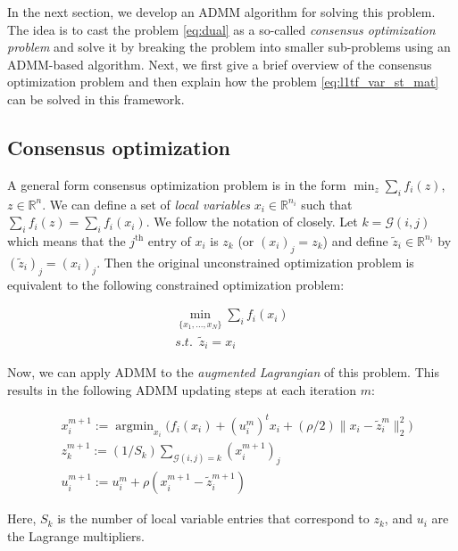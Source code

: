 \documentclass[review]{elsarticle}
\DeclareMathOperator*{\argmin}{argmin}
\begin{document}
In the next section, we develop an ADMM algorithm for solving this problem. The idea is to cast the problem \ref{eq:dual} as a so-called \textit{consensus optimization problem} \cite{boyd_distributed_2011} and solve it by breaking the problem into smaller sub-problems using an ADMM-based algorithm. Next, we first give a brief overview of the consensus optimization problem and then explain how the problem \ref{eq:l1tf_var_st_mat} can be solved in this framework.

\subsection{Consensus optimization}
\label{sec:consOpt}

A general form consensus optimization problem is in the form $\min_z \sum_i f_i(z)$, $z\in\mathbb{R}^n$. We can define a set of \textit{local variables} $x_i\in \mathbb{R}^{n_i}$ such that $\sum_i f_i(z)=\sum_i f_i(x_i)$. We follow the notation of \cite{boyd_distributed_2011} closely. Let $k=\mathscr{G}(i,j)$ which means that the $j^\text{th}$ entry of $x_i$ is $z_k$ (or $(x_i)_j=z_k$) and define $\tilde{z}_i \in \mathbb{R}^{n_i}$ by $(\tilde{z}_i)_j=(x_i)_j$. Then the original unconstrained optimization problem is equivalent to the following constrained optimization problem:

\begin{equation}
\begin{aligned}
\min_{\{x_1,...,x_N  \}} \sum_i f_i(x_i)\\
 s.t. \,\,\, \tilde{z}_i=x_i \,\,\,\,\,\,
\end{aligned}
\end{equation}

Now, we can apply ADMM to the \textit{augmented Lagrangian} of this problem. This results in the following ADMM updating steps at each iteration $m$:

\begin{equation}
\begin{aligned}
& x_i^{m+1}:=\argmin_{x_i} \bigg( f_i(x_i) + (u_i^m)^t x_i + (\rho/2) \lVert x_i-\tilde{z}_i^m \lVert_2^2\bigg)\\
& z_k^{m+1}:=(1/S_k)\sum_{\mathscr{G}(i,j)=k} (x_i^{m+1})_j\\
& u_i^{m+1}:=u_i^m + \rho (x_i^{m+1}-\tilde{z}_i^{m+1})
\end{aligned}
\label{eq:ADMM_steps}
\end{equation}

Here, $S_k$ is the number of local variable entries that correspond to $z_k$, and $u_i$ are the Lagrange multipliers. 
\end{document}
